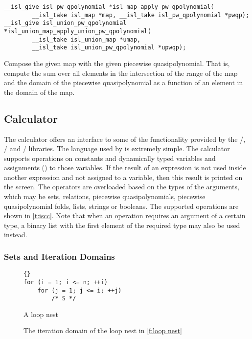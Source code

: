 \begin{verbatim}
__isl_give isl_pw_qpolynomial *isl_map_apply_pw_qpolynomial(
        __isl_take isl_map *map, __isl_take isl_pw_qpolynomial *pwqp);
__isl_give isl_union_pw_qpolynomial *isl_union_map_apply_union_pw_qpolynomial(
        __isl_take isl_union_map *umap,
        __isl_take isl_union_pw_qpolynomial *upwqp);
\end{verbatim}
Compose the given map with the given piecewise quasipolynomial.
That is, compute the sum over all elements in the intersection
of the range of the map and the domain of the piecewise quasipolynomial
as a function of an element in the domain of the map.

\subsection{Calculator}

The  calculator offers an interface to some
of the functionality provided by the \isl/, \cloog/ and \barvinok/
libraries.
The language used by  is extremely simple.  The calculator
supports operations on constants and dynamically typed variables and
assignments (\ai[\tt]{:=}) to those variables.  If the result of an expression
is not used inside another expression and not assigned to a variable,
then this result is printed on the screen.  The operators are overloaded
based on the types of the arguments, which may be sets, relations,
piecewise quasipolynomials, piecewise quasipolynomial folds, lists,
strings or booleans.
The supported operations are shown in \autoref{t:iscc}.
Note that when an operation requires an argument of a certain
type, a binary list with the first element of the required type
may also be used instead.

\subsubsection{Sets and Iteration Domains}

\begin{figure}
\begin{lstlisting}[escapechar=@]{}
for (i = 1; i <= n; ++i)
    for (j = 1; j <= i; ++j)
        /* S */
\end{lstlisting}
\caption{A loop nest}
\label{f:loop nest}
\end{figure}

\begin{figure}
\caption{The iteration domain of the loop nest in \autoref{f:loop nest}}
\label{f:iteration domain}
\end{figure}


